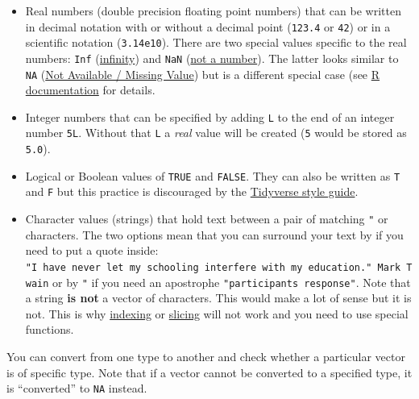 \documentclass[
]{book}
\providecommand{\tightlist}{%
  \setlength{\itemsep}{0pt}\setlength{\parskip}{0pt}}
\begin{document}
\begin{itemize}
\tightlist
\item
  Real numbers (double precision floating point numbers) that can be written in decimal notation with or without a decimal point (\texttt{123.4} or \texttt{42}) or in a scientific notation (\texttt{3.14e10}). There are two special values specific to the real numbers: \texttt{Inf} (\href{https://stat.ethz.ch/R-manual/R-devel/library/base/html/is.finite.html}{infinity}) and \texttt{NaN} (\href{https://stat.ethz.ch/R-manual/R-devel/library/base/html/is.finite.html}{not a number}). The latter looks similar to \texttt{NA} (\href{https://stat.ethz.ch/R-manual/R-devel/library/base/html/NA.html}{Not Available / Missing Value}) but is a different special case (see \href{https://stat.ethz.ch/R-manual/R-devel/library/base/html/is.finite.html}{R documentation} for details.
\item
  Integer numbers that can be specified by adding \texttt{L} to the end of an integer number \texttt{5L}. Without that \texttt{L} a \emph{real} value will be created (\texttt{5} would be stored as \texttt{5.0}).
\item
  Logical or Boolean values of \texttt{TRUE} and \texttt{FALSE}. They can also be written as \texttt{T} and \texttt{F} but this practice is discouraged by the \href{https://style.tidyverse.org/syntax.html?q=TRUE\#logical-vectors}{Tidyverse style guide}.
\item
  Character values (strings) that hold text between a pair of matching \texttt{"} or \texttt{\textquotesingle{}} characters. The two options mean that you can surround your text by \texttt{\textquotesingle{}} if you need to put a quote inside: \texttt{\textquotesingle{}"I\ have\ never\ let\ my\ schooling\ interfere\ with\ my\ education."\ Mark\ Twain\textquotesingle{}} or by \texttt{"} if you need an apostrophe \texttt{"participant\textquotesingle{}s\ response"}. Note that a string \textbf{is not} a vector of characters. This would make a lot of sense but it is not. This is why \protect\hyperlink{vector-index}{indexing} or \protect\hyperlink{vector-index-slicing}{slicing} will not work and you need to use special functions.
\end{itemize}

You can convert from one type to another and check whether a particular vector is of specific type. Note that if a vector cannot be converted to a specified type, it is ``converted'' to \texttt{NA} instead.
\end{document}
